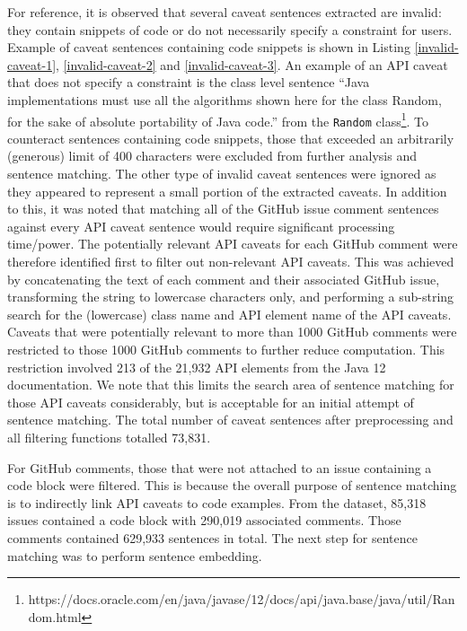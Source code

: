 For reference, it is observed that several caveat sentences extracted are invalid: they contain snippets of code or do not necessarily specify a constraint for users. Example of caveat sentences containing code snippets is shown in Listing \ref{invalid-caveat-1}, \ref{invalid-caveat-2} and \ref{invalid-caveat-3}. An example of an API caveat that does not specify a constraint is the class level sentence ``Java implementations must use all the algorithms shown here for the class Random, for the sake of absolute portability of Java code.'' from the \lstinline{Random} class\footnote{https://docs.oracle.com/en/java/javase/12/docs/api/java.base/java/util/Random.html}. To counteract sentences containing code snippets, those that exceeded an arbitrarily (generous) limit of 400 characters were excluded from further analysis and sentence matching. The other type of invalid caveat sentences were ignored as they appeared to represent a small portion of the extracted caveats.
In addition to this, it was noted that matching all of the GitHub issue comment sentences against every API caveat sentence would require significant processing time/power. The potentially relevant API caveats for each GitHub comment were therefore identified first to filter out non-relevant API caveats. This was achieved by concatenating the text of each comment and their associated GitHub issue, transforming the string to lowercase characters only, and performing a sub-string search for the (lowercase) class name and API element name of the API caveats. Caveats that were potentially relevant to more than 1000 GitHub comments were restricted to those 1000 GitHub comments to further reduce computation. This restriction involved 213 of the 21,932 API elements from the Java 12 documentation. We note that this limits the search area of sentence matching for those API caveats considerably, but is acceptable for an initial attempt of sentence matching. The total number of caveat sentences after preprocessing and all filtering functions totalled 73,831.\bigbreak

For GitHub comments, those that were not attached to an issue containing a code block were filtered. This is because the overall purpose of sentence matching is to indirectly link API caveats to code examples. From the dataset, 85,318 issues contained a code block with  290,019 associated comments. Those comments contained 629,933 sentences in total. The next step for sentence matching was to perform sentence embedding.\\
\clearpage

